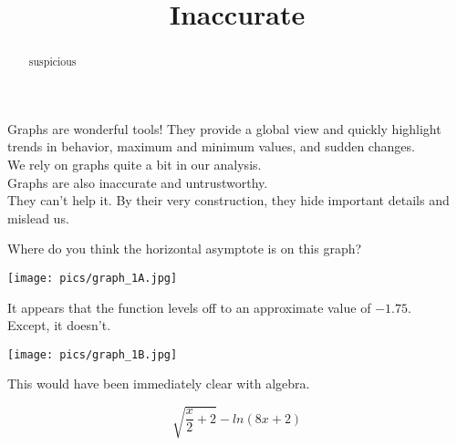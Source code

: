 \documentclass{ximera}
\title{Inaccurate}
\begin{document}
\begin{abstract}
suspicious
\end{abstract}
\maketitle



Graphs are wonderful tools!  They provide a global view and quickly highlight trends in behavior, maximum and minimum values, and sudden changes. \\

We rely on graphs quite a bit in our analysis. \\

Graphs are also inaccurate and untrustworthy. \\

They can't help it.  By their very construction, they hide important details and mislead us.





\begin{example}


Where do you think the horizontal asymptote is on this graph?

\begin{image}
\texttt{[image: pics/graph\_1A.jpg]}
\end{image}

It appears that the function levels off to an approximate value of $-1.75$. \\


Except, it doesn't.

\begin{image}
\texttt{[image: pics/graph\_1B.jpg]}
\end{image}

This would have been immediately clear with algebra.

\[  \sqrt{\frac{x}{2}+2} - ln(8x+2)      \]


\end{example}
\end{document}
